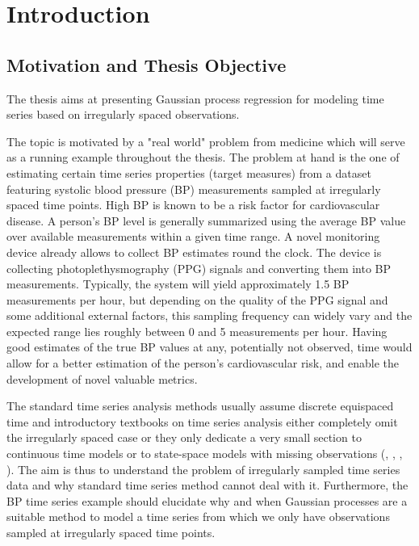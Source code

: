\chapter{Introduction}\label{ch:introduction}

\section{Motivation and Thesis Objective}\label{sec:thesis-objective}

The thesis aims at presenting Gaussian process regression for modeling time
series based on irregularly spaced observations.

The topic is motivated by a "real world" problem from medicine which will
serve as a running example throughout the thesis.
%
The problem at hand is the one of estimating certain time series properties (target measures) from a dataset
featuring systolic blood pressure (BP) measurements sampled at irregularly spaced time points.
High BP is known to be a risk factor for cardiovascular disease.
A person’s BP level is generally summarized using the average BP value over available measurements within a given time range.
A novel monitoring device already allows to collect BP estimates round the clock.
The device is collecting photoplethysmography (PPG) signals and converting them into BP measurements.
Typically, the system will yield approximately 1.5 BP measurements per hour, but depending on the quality of the PPG signal and some additional external factors,
this sampling frequency can widely vary and the expected range lies roughly between 0 and 5 measurements per hour.
Having good estimates of the true BP values at any, potentially not observed, time would allow for a better estimation
of the person’s cardiovascular risk, and enable the development of novel valuable metrics.

The standard time series analysis methods usually assume discrete equispaced
time and introductory textbooks on time series analysis either completely omit
the irregularly spaced case or they only dedicate
a very small section to continuous time models or to state-space models
with missing observations (\citeauthor{brockwell_time_1991}, \citeauthor{brockwell_introduction_2016},
\citeauthor{cryer_time_2008}, \citeauthor{chatfield_analysis_2003}).
The aim is thus to understand the problem of irregularly sampled time series data
and why standard time series method cannot deal with it.
Furthermore, the BP time series example should elucidate why and when Gaussian processes are a
suitable method to model a time series from which we only have observations sampled at
irregularly spaced time points.


